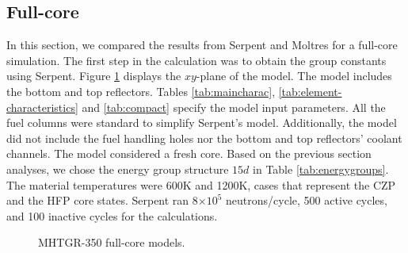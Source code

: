 \documentclass[11pt,letterpaper]{article}
\begin{document}
\subsection{Full-core}

In this section, we compared the results from Serpent and Moltres for a full-core simulation.
The first step in the calculation was to obtain the group constants using Serpent.
Figure \ref{fig:fullcoremodel} displays the $xy$-plane of the model.
The model includes the bottom and top reflectors.
Tables \ref{tab:maincharac}, \ref{tab:element-characteristics} and \ref{tab:compact} specify the model input parameters.
All the fuel columns were standard to simplify Serpent’s model.
Additionally, the model did not include the fuel handling holes nor the bottom and top reflectors' coolant channels.
The model considered a fresh core.
Based on the previous section analyses, we chose the energy group structure $15d$ in Table \ref{tab:energygroups}.
The material temperatures were 600K and 1200K, cases that represent the \gls{CZP} and the \gls{HFP} core states.
Serpent ran 8$\times 10^5$ neutrons/cycle, 500 active cycles, and 100 inactive cycles for the calculations.

\begin{figure}[htbp!]
	\centering
	\hfill
  \caption{MHTGR-350 full-core models.}
	\label{fig:fullcoremodel}
\end{figure}
\end{document}
